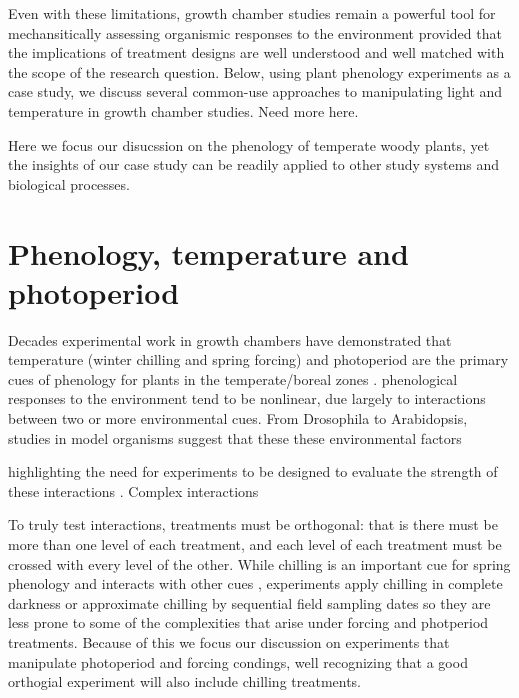 \documentclass{article}[11pt]
\begin{document}
\noindent Even with these limitations, growth chamber studies remain a powerful tool for mechansitically assessing organismic responses to the environment provided that the implications of  treatment designs are well understood and well matched with the scope of the research question. Below, using plant phenology experiments as a case study, we discuss several common-use approaches to manipulating light and temperature in growth chamber studies. Need more here. %

Here we focus our disucssion on the phenology of temperate woody plants, yet the insights of our case study can be readily applied to other study systems and biological processes.\\ 

\section*{Phenology, temperature and photoperiod}
\noindent Decades experimental work in growth chambers have demonstrated that temperature (winter chilling and spring forcing) and photoperiod are the primary cues of phenology for plants in the temperate/boreal zones \citep{}.  phenological responses to the environment tend to be nonlinear, due largely to interactions between two or more environmental cues\citep{Flynn2018,Laube2014}. From Drosophila \citep{Moghadam:2019aa,} to Arabidopsis, studies in model organisms suggest that these these environmental factors

highlighting the need for experiments to be designed to evaluate the strength of these interactions \citep{MacLean:2019aa}. Complex interactions 

To truly test interactions, treatments must be orthogonal: that is there must be more than one level of each treatment, and each level of each treatment must be crossed with every level of the other. While chilling is an important cue for spring phenology\citep{Ettinger2020} and interacts with other cues\citep{Flynn2018} , experiments apply chilling in complete darkness or approximate chilling by sequential field sampling dates so they are less prone to some of the complexities that arise under forcing and photperiod treatments. Because of this we focus our discussion on experiments that manipulate photoperiod and forcing condings, well recognizing that a good orthogial experiment will also include chilling treatments. \\
\end{document}
